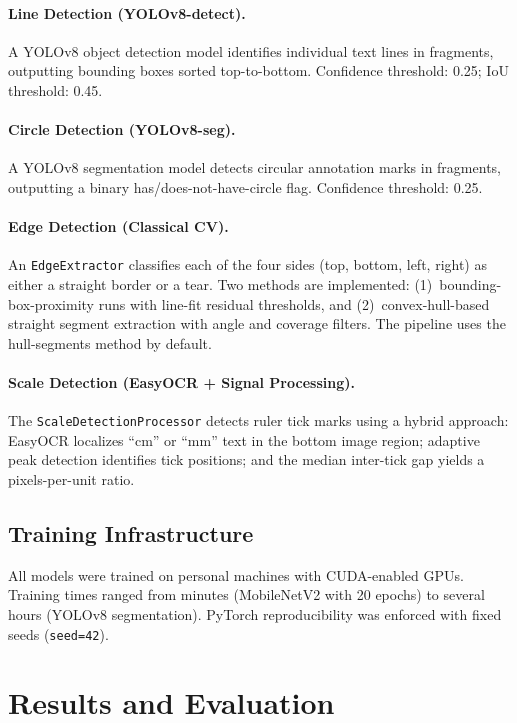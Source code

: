 \documentclass[11pt]{article}
\begin{document}
\paragraph{Line Detection (YOLOv8-detect).}
A YOLOv8 object detection model identifies individual text lines in fragments, outputting bounding boxes sorted top-to-bottom.  Confidence threshold: 0.25; IoU threshold: 0.45.

\paragraph{Circle Detection (YOLOv8-seg).}
A YOLOv8 segmentation model detects circular annotation marks in fragments, outputting a binary has/does-not-have-circle flag. Confidence threshold: 0.25.

\paragraph{Edge Detection (Classical CV).}
An \texttt{EdgeExtractor} classifies each of the four sides (top, bottom, left, right) as either a straight border or a tear.
Two methods are implemented: (1)~bounding-box-proximity runs with line-fit residual thresholds, and (2)~convex-hull-based straight segment extraction with angle and coverage filters.
The pipeline uses the hull-segments method by default.

\paragraph{Scale Detection (EasyOCR + Signal Processing).}
The \texttt{ScaleDetectionProcessor} detects ruler tick marks using a hybrid approach: EasyOCR localizes ``cm'' or ``mm'' text in the bottom image region; adaptive peak detection identifies tick positions; and the median inter-tick gap yields a pixels-per-unit ratio.

\subsection{Training Infrastructure}

All models were trained on personal machines with CUDA-enabled GPUs.  Training times ranged from minutes (MobileNetV2 with 20 epochs) to several hours (YOLOv8 segmentation).  PyTorch reproducibility was enforced with fixed seeds (\texttt{seed=42}).

\section{Results and Evaluation}
\end{document}
